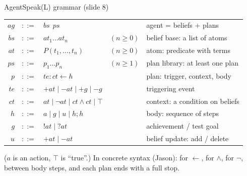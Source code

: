\begin{nbdef}{AgentSpeak(L) grammar (slide 8)}
\begin{center}
\renewcommand{\arraystretch}{1.25}
\begin{tabular}{@{}r@{\ }c@{\ }l l l@{}}
$ag$ & $::=$ & $bs\ \ ps$ & & agent = beliefs + plans \\
$bs$ & $::=$ & $at_1 \ldots at_n$ & $(n \geq 0)$ & belief base: a list of atoms \\
$at$ & $::=$ & $P(t_1, \ldots, t_n)$ & $(n \geq 0)$ & atom: predicate with terms \\
$ps$ & $::=$ & $p_1 \ldots p_n$ & $(n \geq 1)$ & plan library: at least one plan \\
$p$ & $::=$ & $te : ct \leftarrow h$ & & plan: trigger, context, body \\
$te$ & $::=$ & $+at \mid -at \mid +g \mid -g$ & & triggering event \\
$ct$ & $::=$ & $at \mid \neg at \mid ct \land ct \mid \top$ & & context: a condition on beliefs \\
$h$ & $::=$ & $a \mid g \mid u \mid h ; h$ & & body: sequence of steps \\
$g$ & $::=$ & $!at \mid ?at$ & & achievement / test goal \\
$u$ & $::=$ & $+at \mid -at$ & & belief update: add / delete \\
\end{tabular}
\end{center}
($a$ is an action, $\top$ is ``true''.) In concrete syntax (Jason): \code{<-} for
$\leftarrow$, \code{\&} for $\land$,  for $\neg$, \code{;} between body steps, and
each plan ends with a full stop.
\end{nbdef}

\begin{center}
\end{center}

